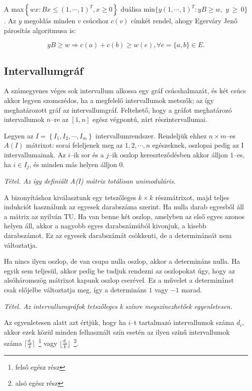 A max$\left\{ wx : Bx \leq (1,\cdots,1)^T, x \geq 0 \right\}$ duálisa
min$\{ y(1,\cdots,1)^T : yB \geq w,$ $y~\geq~0\}$. Az $y$ megoldás
minden $v$ csúcshoz $c(v)$ címkét rendel, ahogy Egerváry Jenő párosítás
algoritmusa is:

\[ yB \geq w \Rightarrow c(a) + c(b) \geq w(e), \forall e=\{a,b\}\in E.\]

\subsection{Intervallumgráf}

A számegyenes véges sok intervallum alkossa egy gráf csúcshalmazát, és két csúcs
akkor legyen szomszédos, ha a megfelelő intervallumok metszők; az így
meghatározott gráf az intervallumgráf. Feltehető, hogy a gráfot meghatározó
intervallumok $n$--re az $[1,n]$ egész végpontú, zárt részintervallumai.

Legyen az $I=\left\{I_1, I_2, \cdots, I_m\right\}$ intervallumrendszer.
Rendeljük ehhez $n \times m$--es $A(I)$ mátrixot: sorai feleljenek meg az
$1,2,\cdots,n$ egészeknek, oszlopai pedig az I intervallumainak. Az $i$--ik sor
és a $j$--ik oszlop kereszteződésben akkor álljon $1$--es, ha $i \in I_j$, és
minden más helyen álljon $0$.
\vspace{0.4cm}

\emph{Tétel. Az így definiált A(I) mátrix totálisan unimoduláris.}
\vspace{0.4cm}

A bizonyításhoz kiválasztunk egy tetszőleges $k \times k$ részmátrixot, majd
teljes indukciót használunk az egyesek darabszáma szerint. Ha nulla darab
egyesből áll a mátrix az nyilván TU. Ha van benne két oszlop, amelyben az első
egyes azonos helyen áll, akkor a nagyobb egyes darabszámúból kivonjuk, a kisebb
darabszámot. Ez az egyesek darabszámát csökkenti, de a determinánsát nem
változtatja.

Ha nincs ilyen oszlop, de van csupa nulla oszlop, akkor a determináns nulla. Ha
egyik sem teljesül, akkor pedig be tudjuk rendezni az oszlopokat úgy, hogy az
alsóháromszög mátrixot kapunk oszlop cserével. Ez a művelet a determinánst csak
előjelbe változtatja meg, így a determináns $1$ vagy $-1$ marad.
\vspace{0.4cm}

\emph{Tétel. Az intervallumgráfok tetszőleges k színre megszínezhetőek
egyenletesen.}
\vspace{0.4cm}

Az egyenletesen alatt azt értjük, hogy ha $i$--t tartalmazó intervallumok száma
$d_i$, akkor ezek közül minden felhasznált szín esetén az ilyen színű
intervallumok száma $\lceil \frac{d_i}{k} \rceil$~\footnote{felső egész rész}
vagy $\lfloor \frac{d_i}{k} \rfloor$~\footnote{alsó egész rész}.

